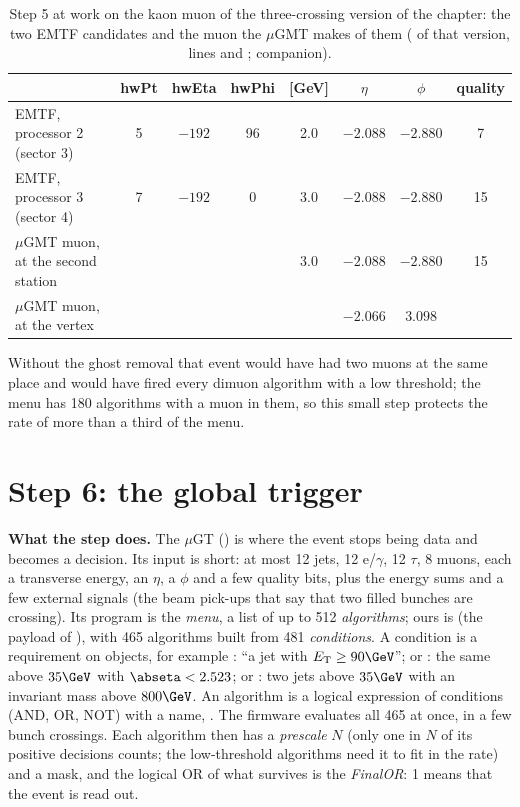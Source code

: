 \begin{table}[!htb]
\centering\small
\caption{Step 5 at work on the kaon muon of the three-crossing version of the chapter: the two EMTF candidates and
the muon the $\mu$GMT makes of them ( of that version, lines  and ;
companion).}
\label{tab:12_gmt}
\begin{tabular}{@{}l ccc ccc c@{}}
\toprule
 & hwPt & hwEta & hwPhi & \pt{} [GeV] & $\eta$ & $\phi$ & quality \\
\midrule
EMTF, processor 2 (sector 3) & 5 & $-192$ & 96 & 2.0 & $-2.088$ & $-2.880$ & 7 \\
EMTF, processor 3 (sector 4) & 7 & $-192$ & 0 & 3.0 & $-2.088$ & $-2.880$ & 15 \\
\midrule
$\mu$GMT muon, at the second station & & & & 3.0 & $-2.088$ & $-2.880$ & 15 \\
$\mu$GMT muon, at the vertex & & & & & $-2.066$ & $3.098$ & \\
\bottomrule
\end{tabular}
\end{table}

Without the ghost removal that event would have had two muons at the same place and would have fired every dimuon
algorithm with a low threshold; the menu has 180 algorithms with a muon in them, so this small step protects the rate
of more than a third of the menu.

\FloatBarrier
\section{Step 6: the global trigger}

\textbf{What the step does.} The $\mu$GT () is where the event stops being data and
becomes a decision. Its input is short: at most 12 jets, 12 e/$\gamma$, 12 $\tau$, 8 muons, each a transverse
energy, an $\eta$, a $\phi$ and a few quality bits, plus the energy sums and a few external signals (the beam
pick-ups that say that two filled bunches are crossing). Its program is the \emph{menu}, a list of up to 512
\emph{algorithms}; ours is  (the payload 
of ), with 465 algorithms built from 481 \emph{conditions}. A condition is a
requirement on objects, for example : ``a jet with $E_{\mathrm T}\geq90\GeV$''; or
: the same above $35\GeV$ with $\abseta<2.523$; or :
two jets above $35\GeV$ with an invariant mass above $800\GeV$. An algorithm is a logical expression of
conditions (AND, OR, NOT) with a name, . The firmware evaluates all 465 at once, in a few
bunch crossings. Each algorithm then has a \emph{prescale} $N$ (only one in $N$ of its positive decisions counts;
the low-threshold algorithms need it to fit in the rate) and a mask, and the logical OR of what survives is the
\emph{FinalOR}: 1 means that the event is read out.

